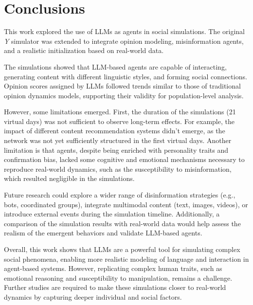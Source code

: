 \section{Conclusions}
\label{sec:conclusion}

This work explored the use of LLMs as agents in social simulations.
The original \textit{Y} simulator was extended to integrate opinion modeling, misinformation agents, and a realistic initialization based on real-world data.

The simulations showed that LLM-based agents are capable of interacting, generating content with different linguistic styles, and forming social connections. 
Opinion scores assigned by LLMs followed trends similar to those of traditional opinion dynamics models, supporting their validity for population-level analysis.

However, some limitations emerged.
First, the duration of the simulations (21 virtual days) was not sufficient to observe long-term effects.
For example, the impact of different content recommendation systems didn't emerge, as the network was not yet sufficiently structured in the first virtual days. 
Another limitation is that agents, despite being enriched with personality traits and confirmation bias, lacked some cognitive and emotional mechanisms necessary to reproduce real-world dynamics, such as the susceptibility to misinformation, which resulted negligible in the simulations.

Future research could explore a wider range of disinformation strategies (e.g., bots, coordinated groups), integrate multimodal content (text, images, videos), or introduce external events during the simulation timeline. 
Additionally, a comparison of the simulation results with real-world data would help assess the realism of the emergent behaviors and validate LLM-based agents.

Overall, this work shows that LLMs are a powerful tool for simulating complex social phenomena, enabling more realistic modeling of language and interaction in agent-based systems.
However, replicating complex human traits, such as emotional reasoning and susceptibility to manipulation, remains a challenge.
Further studies are required to make these simulations closer to real-world dynamics by capturing deeper individual and social factors.
